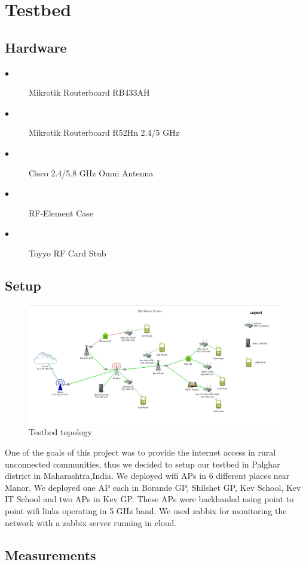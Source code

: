 \documentclass[12pt]{article}
\begin{document}
 
 \section{Testbed}
   \subsection{Hardware}
       \begin{description}
	   	\item[$\bullet$] Mikrotik Routerboard RB433AH 
	   	\item[$\bullet$] Mikrotik Routerboard R52Hn 2.4/5 GHz
	   	\item[$\bullet$] Cisco 2.4/5.8 GHz Omni Antenna
	   	\item[$\bullet$] RF-Element Case
	   	\item[$\bullet$] Toyyo RF Card Stub
	   	
	   	\end{description}
   	 \subsection{Setup}
   	\begin{figure}
   		\includegraphics[width=\linewidth]{testbed_setup.jpg}
   		\caption{Testbed topology}
   		\label{fig:boat1}
   	\end{figure}
   	 One of the goals of this project was to provide the internet access in rural unconnected communities, thus we decided to setup our testbed in Palghar district in Maharashtra,India. We deployed wifi APs in 6 different places near Manor. We deployed one AP each in Borande GP, Shilshet GP, Kev School, Kev IT School and two APs in Kev GP. These APs were backhauled using point to point wifi links operating in 5 GHz band. We used zabbix for monitoring the network with a zabbix server running in cloud.
   	 \subsection{Measurements}
   	 
   	 
   	   
   
   
   
    
    
  
\end{document}
